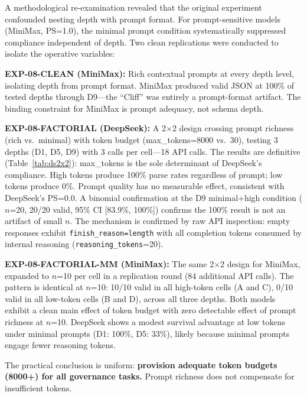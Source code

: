 \documentclass[11pt,a4paper]{article}
\begin{document}
A methodological re-examination revealed that the original experiment confounded nesting depth with prompt format. For prompt-sensitive models (MiniMax, PS=1.0), the minimal prompt condition systematically suppressed compliance independent of depth. Two clean replications were conducted to isolate the operative variables:

\textbf{EXP-08-CLEAN (MiniMax):} Rich contextual prompts at every depth level, isolating depth from prompt format. MiniMax produced valid JSON at 100\% of tested depths through D9---the ``Cliff'' was entirely a prompt-format artifact. The binding constraint for MiniMax is prompt adequacy, not schema depth.

\textbf{EXP-08-FACTORIAL (DeepSeek):} A 2$\times$2 design crossing prompt richness (rich vs.\ minimal) with token budget (max\_tokens=8000 vs.\ 30), testing 3 depths (D1, D5, D9) with 3 calls per cell---18 API calls. The results are definitive (Table~\ref{tab:ds2x2}): max\_tokens is the sole determinant of DeepSeek's compliance. High tokens produce 100\% parse rates regardless of prompt; low tokens produce 0\%. Prompt quality has no measurable effect, consistent with DeepSeek's PS=0.0. A binomial confirmation at the D9 minimal+high condition ($n$=20, 20/20 valid, 95\% CI [83.9\%, 100\%]) confirms the 100\% result is not an artifact of small $n$. The mechanism is confirmed by raw API inspection: empty responses exhibit \texttt{finish\_reason=length} with all completion tokens consumed by internal reasoning (\texttt{reasoning\_tokens}=20).

\textbf{EXP-08-FACTORIAL-MM (MiniMax):} The same 2$\times$2 design for MiniMax, expanded to $n$=10 per cell in a replication round (84 additional API calls). The pattern is identical at $n$=10: 10/10 valid in all high-token cells (A and C), 0/10 valid in all low-token cells (B and D), across all three depths. Both models exhibit a clean main effect of token budget with zero detectable effect of prompt richness at $n$=10. DeepSeek shows a modest survival advantage at low tokens under minimal prompts (D1: 100\%, D5: 33\%), likely because minimal prompts engage fewer reasoning tokens.

The practical conclusion is uniform: \textbf{provision adequate token budgets (8000+) for all governance tasks.} Prompt richness does not compensate for insufficient tokens.
\end{document}
